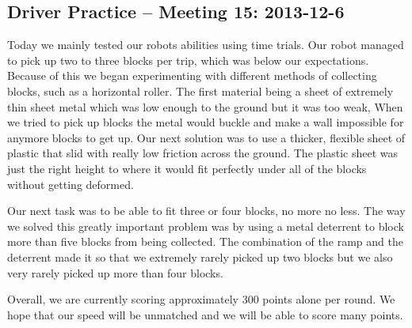 \newpage \subsection{Driver Practice -- Meeting 15: 2013-12-6}
Today we mainly tested our robots abilities using time trials.  Our robot managed to pick up two to three blocks per trip, which was below our expectations.  Because of this we began experimenting with different methods of collecting blocks, such as a horizontal roller. The first material being a sheet of extremely thin sheet metal which was low enough to the ground but it was too weak, When we tried to pick up blocks the metal would buckle and make a wall impossible for anymore blocks to get up.  Our next solution was to use a thicker, flexible sheet of plastic that slid with really low friction across the ground.  The plastic sheet was just the right height to where it would fit perfectly under all of the blocks without getting deformed. 

Our next task was to be able to fit three or four blocks, no more no less.  The way we solved this greatly important problem was by using a metal deterrent to block more than five blocks from being collected.  The combination of the ramp and the deterrent made it so that we extremely rarely picked up two blocks but we also very rarely picked up more than four blocks.

Overall, we are currently scoring approximately 300 points alone per round. We hope that our speed will be unmatched and we will be able to score many points. 
